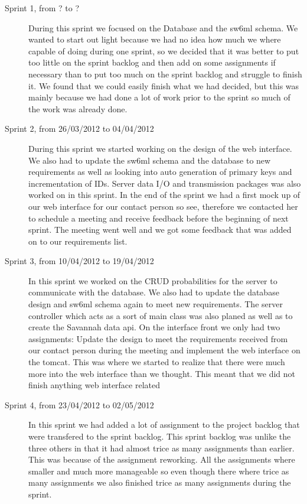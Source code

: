 \begin{description}
\item [Sprint 1, from ? to ?]
	During this sprint we focused on the Database and the sw6ml schema. We wanted to start out light because we had no idea how much we where capable of doing during one sprint, so we decided that it was better to put too little on the sprint backlog and then add on some assignments if necessary than to put too much on the sprint backlog and struggle to finish it. We found that we could easily finish what we had decided, but this was mainly because we had done a lot of work prior to the sprint so much of the work was already done.
\item[Sprint 2, from 26/03/2012 to 04/04/2012]
	During this sprint we started working on the design of the web interface. We also had to update the sw6ml schema and the database to new requirements as well as looking into auto generation of primary keys and incrementation of IDs. Server data I/O and transmission packages was also worked on in this sprint. In the end of the sprint we had a first mock up of our web interface for our contact person so see, therefore we contacted her to schedule a meeting and receive feedback before the beginning of next sprint. The meeting went well and we got some feedback that was added on to our requirements list. 
\item[Sprint 3, from 10/04/2012 to 19/04/2012]
	In this sprint we worked on the CRUD probabilities for the server to communicate with the database. We also had to update the database design and sw6ml schema again to meet new requirements. The server controller which acts as a sort of main class was also planed as well as to create the Savannah data api. On the interface front we only had two assignments: Update the design to meet the requirements received from our contact person during the meeting and implement the web interface on the tomcat. This was where we started to realize that there were much more into the web interface than we thought. This meant that we did not finish anything web interface related
\item [Sprint 4, from 23/04/2012 to 02/05/2012]
	In this sprint we had added a lot of assignment to the project backlog that were transfered to the sprint backlog. This sprint backlog was unlike the three others in that it had almost trice as many assignments than earlier. This was because of the assignment reworking. All the assignments where smaller and much more manageable so even though there where trice as many assignments we also finished trice as many assignments during the sprint.

\end{description}
